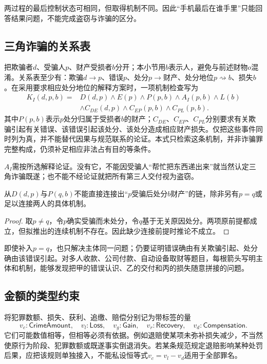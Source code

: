 两过程的最后控制状态可相同，但取得机制不同。因此“手机最后在谁手里”只能回答结果问题，不能完成盗窃与诈骗的区分。

\subsection{三角诈骗的关系表}
把欺骗者$d$、受骗人$p$、财产受损者$b$分开；本小节用$b$表示人，避免与前述财物$o$混淆。关系表至少有：欺骗$d\to p$、错误$p$、处分$p\to\text{财产}$、处分地位$p\rightsquigarrow b$、损失$b$。在采用要求相应处分地位的解释方案时，一项机制检查写为
\begin{align*}
 K_I(d,p,b)={}&D(d,p)\wedge E(p)\wedge P(p,b)\wedge A_I(p,b)\wedge L(b)\\
 &\wedge C_{DE}(d,p)\wedge C_{EP}(p,b)\wedge C_{PL}(p,b).
\end{align*}
其中$P(p,b)$表示$p$处分归属于受损者$b$的财产；$C_{DE}$、$C_{EP}$、$C_{PL}$分别要求有关欺骗引起有关错误、该错误引起该处分、该处分造成相应财产损失。仅把这些事件同时列为真，并不能替代因果与规范联系的论证。本式只检索这条机制，并非诈骗罪完整构成，仍须补足相应非法占有目的等条件。

$A_I$需按所选解释论证。没有它，不能因受骗人“帮忙把东西递出来”就当然认定三角诈骗既遂；也不能不经论证就把所有第三人交付视为盗窃。

\begin{modelprop}[关系连接必须保留同一主体]
从$D(d,p)$与$P(q,b)$不能直接连接出“$p$受骗后处分$b$财产”的链，除非另有$p=q$或足以连接两人的具体机制。
\end{modelprop}
\begin{proof}
取$p\ne q$，令$p$确实受骗而未处分，令$q$基于无关原因处分。两项原前提都成立，但拟推出的连续机制不存在。因此缺少连接前提时推论不成立。
\end{proof}

即使补入$p=q$，也只解决主体同一问题；仍要证明错误确由有关欺骗引起、处分确由该错误引起。对多人收款、公司付款、自动设备取财等题目，每根箭头写明主体和机制，能够发现把甲的错误认识、乙的交付和丙的损失随意拼接的问题。

\subsection{金额的类型约束}
将犯罪数额、损失、获利、追缴、赔偿分别记为带标签的量
\[
 v_c:\mathsf{CrimeAmount},\quad v_l:\mathsf{Loss},\quad
 v_g:\mathsf{Gain},\quad v_r:\mathsf{Recovery},\quad v_d:\mathsf{Compensation}.
\]
它们可能数值相等，但相等必须有依据。例如退赔使某项未弥补损失减少，不当然使原行为阶段、犯罪数额或既遂事实倒退消失。若某条规范规定退赔影响某种处罚后果，应把该规则单独接入，不能私设恒等式$v_c=v_l-v_d$适用于全部罪名。

